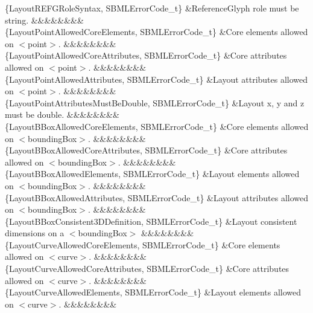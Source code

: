 \begin{DoxyParagraph}{}
\begin{longtabu}
\{Layout\+R\+E\+F\+G\+Role\+Syntax, S\+B\+M\+L\+Error\+Code\+\_\+t\} &Reference\+Glyph \textquotesingle{}role\textquotesingle{} must be string. &&&&&&&&\\
\{Layout\+Point\+Allowed\+Core\+Elements, S\+B\+M\+L\+Error\+Code\+\_\+t\} &Core elements allowed on {\ttfamily $<$point$>$}. &&&&&&&&\\
\{Layout\+Point\+Allowed\+Core\+Attributes, S\+B\+M\+L\+Error\+Code\+\_\+t\} &Core attributes allowed on {\ttfamily $<$point$>$}. &&&&&&&&\\
\{Layout\+Point\+Allowed\+Attributes, S\+B\+M\+L\+Error\+Code\+\_\+t\} &Layout attributes allowed on {\ttfamily $<$point$>$}. &&&&&&&&\\
\{Layout\+Point\+Attributes\+Must\+Be\+Double, S\+B\+M\+L\+Error\+Code\+\_\+t\} &Layout \textquotesingle{}x\textquotesingle{}, \textquotesingle{}y\textquotesingle{} and \textquotesingle{}z\textquotesingle{} must be double. &&&&&&&&\\
\{Layout\+B\+Box\+Allowed\+Core\+Elements, S\+B\+M\+L\+Error\+Code\+\_\+t\} &Core elements allowed on {\ttfamily $<$bounding\+Box$>$}. &&&&&&&&\\
\{Layout\+B\+Box\+Allowed\+Core\+Attributes, S\+B\+M\+L\+Error\+Code\+\_\+t\} &Core attributes allowed on {\ttfamily $<$bounding\+Box$>$}. &&&&&&&&\\
\{Layout\+B\+Box\+Allowed\+Elements, S\+B\+M\+L\+Error\+Code\+\_\+t\} &Layout elements allowed on {\ttfamily $<$bounding\+Box$>$}. &&&&&&&&\\
\{Layout\+B\+Box\+Allowed\+Attributes, S\+B\+M\+L\+Error\+Code\+\_\+t\} &Layout attributes allowed on {\ttfamily $<$bounding\+Box$>$}. &&&&&&&&\\
\{Layout\+B\+Box\+Consistent3\+D\+Definition, S\+B\+M\+L\+Error\+Code\+\_\+t\} &Layout consistent dimensions on a {\ttfamily $<$bounding\+Box$>$} &&&&&&&&\\
\{Layout\+Curve\+Allowed\+Core\+Elements, S\+B\+M\+L\+Error\+Code\+\_\+t\} &Core elements allowed on {\ttfamily $<$curve$>$}. &&&&&&&&\\
\{Layout\+Curve\+Allowed\+Core\+Attributes, S\+B\+M\+L\+Error\+Code\+\_\+t\} &Core attributes allowed on {\ttfamily $<$curve$>$}. &&&&&&&&\\
\{Layout\+Curve\+Allowed\+Elements, S\+B\+M\+L\+Error\+Code\+\_\+t\} &Layout elements allowed on {\ttfamily $<$curve$>$}. &&&&&&&&\\

\end{longtabu}
\end{DoxyParagraph}
